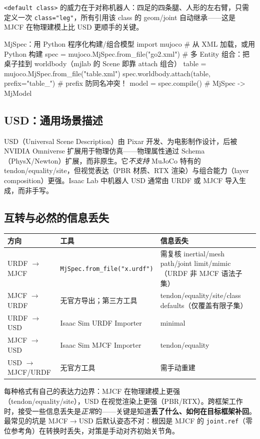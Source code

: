 \verb|<default class>| 的威力在于对称机器人：四足的四条腿、人形的左右臂，只需定义一次 \verb|class="leg"|，所有引用该 class 的 geom/joint 自动继承——这是 MJCF 在物理建模上比 USD 更顺手的关键。

\begin{codebox}[Python]{MjSpec：用 Python 程序化构建/组合模型}
import mujoco
# 从 XML 加载，或用 Python 构建
spec = mujoco.MjSpec.from_file("go2.xml")
# 多 Entity 组合：把桌子挂到 worldbody（mjlab 的 Scene 即靠 attach 组合）
table = mujoco.MjSpec.from_file("table.xml")
spec.worldbody.attach(table, prefix="table_")   # prefix 防同名冲突！
model = spec.compile()                            # MjSpec -> MjModel
\end{codebox}

\subsection{USD：通用场景描述}

USD（Universal Scene Description）由 Pixar 开发、为电影制作设计，后被 NVIDIA Omniverse 扩展用于物理仿真——物理属性通过 Schema（PhysX/Newton）扩展，而非原生。它\emph{不支持} MuJoCo 特有的 tendon/equality/site，但视觉表达（PBR 材质、RTX 渲染）与组合能力（layer composition）更强。Isaac Lab 中机器人 USD 通常由 URDF 或 MJCF 导入生成，而非手写。

\subsection{互转与必然的信息丢失}

\begin{center}
\small
\begin{tabular}{@{}llp{4.0cm}@{}}
\toprule
方向 & 工具 & 信息丢失 \\
\midrule
URDF $\to$ MJCF & \verb|MjSpec.from_file("x.urdf")| & 需复核 inertial/mesh path/joint limit/mimic（URDF 非 MJCF 语法子集） \\
MJCF $\to$ URDF & 无官方导出；第三方工具 & tendon/equality/site/class defaults（仅覆盖有限子集） \\
URDF $\to$ USD & Isaac Sim URDF Importer & minimal \\
MJCF $\to$ USD & Isaac Sim MJCF Importer & tendon/equality \\
USD $\to$ MJCF/URDF & 无官方工具 & 需手动重建 \\
\bottomrule
\end{tabular}
\end{center}

\begin{insight}\label{ins:rlmc-phys-format}
每种格式有自己的表达力边界：MJCF 在物理建模上更强（tendon/equality/site），USD 在视觉渲染上更强（PBR/RTX）。跨框架工作时，接受一些信息丢失是\emph{正常}的——关键是知道\textbf{丢了什么、如何在目标框架补回}。最常见的坑是 MJCF$\to$USD 后默认姿态不对：根因是 MJCF 的 \verb|joint.ref|（零位参考角）在转换时丢失，对策是手动对齐初始关节角。
\end{insight}

